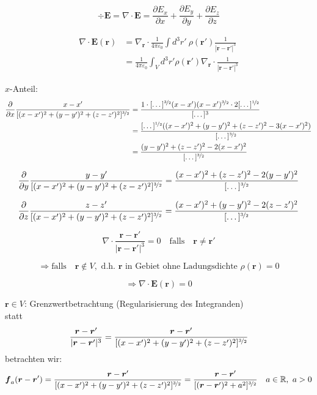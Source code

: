 \documentclass[titlepage,11pt,a4paper,ngerman]{report}
\newcommand{\prt}[2]{\frac{\partial #1}{\partial #2}}
\newcommand{\kq}{\frac{1}{4\pi\epsilon_0}}
\renewcommand{\vec}[1]{\boldsymbol{#1}}
\renewcommand{\epsilon}{\varepsilon}
\begin{document}
$$\div \vec{E} = \nabla \cdot \vec{E} = \prt{E_x}{x} + \prt{E_y}{y} + \prt{E_z}{z}$$

\begin{align*}
\nabla \cdot \vec{E}(\vec{r}) &= \nabla_{\vec{r}} \cdot \kq \int d^3r'\ \rho(\vec{r}') \frac{1}{|\vec{r} - \vec{r}'|^3}\\
&= \kq \int_V d^3 r' \rho (\vec{r}') \nabla_{\vec{r}} \cdot \frac{1}{|\vec{r} - \vec{r}'|^3}
\end{align*}

$x$-Anteil:
\begin{align*}
\frac{\partial}{\partial x}\frac{x-x'}{[(x-x')^2 + (y-y')^2 + (z-z')^2]^{\nicefrac{3}{2}}} &= \frac{1 \cdot [\dots]^{\nicefrac{3}{2}}(x - x')(x - x')^{\nicefrac{3}{2}}\cdot 2[\dots]^{\nicefrac{1}{2}}}{[\dots]^3}\\
&= \frac{[\dots]^{\nicefrac{1}{2}}((x - x')^2 + (y - y')^2 + (z - z')^2 - 3(x - x')^2)}{[\dots]^{\nicefrac{3}{2}}}\\
&= \frac{(y - y')^2 + (z - z')^2 - 2(x - x')^2}{[\dots]^{\nicefrac{3}{2}}}
\end{align*}

$$\frac{\partial}{\partial y} \frac{y-y'}{[(x-x')^2 + (y-y')^2 + (z-z')^2]^{\nicefrac{3}{2}}} = \frac{(x - x')^2 + (z - z')^2 - 2(y - y')^2}{[\dots]^{\nicefrac{3}{2}}}$$ 

$$\frac{\partial}{\partial z} \frac{z-z'}{[(x-x')^2 + (y-y')^2 + (z-z')^2]^{\nicefrac{3}{2}}} = \frac{(x - x')^2 + (y - y')^2 - 2(z - z')^2}{[\dots]^{\nicefrac{3}{2}}}$$ 

$$\nabla \cdot \frac{\vec{r} - \vec{r}'}{|\vec{r} - \vec{r}'|^3} = 0 \quad \textrm{falls} \quad \vec{r} \neq \vec{r}'$$

$$\Rightarrow \textrm{falls} \quad \vec{r} \notin V, \textrm{ d.h. } \vec{r} \textrm{ in Gebiet ohne Ladungsdichte } \rho(\vec{r}) = 0$$

$$\Rightarrow \nabla \cdot \vec{E}(\vec{r}) = 0$$ 








$\vec{r} \in V$: Grenzwertbetrachtung (Regularisierung des Integranden)\\
statt
$$\frac{\vec{r} - \vec{r}'}{|\vec{r} - \vec{r}'|^3} = \frac{\vec{r}-\vec{r}'}{[(x-x')^2 + (y-y')^2 + (z-z')^2]^{\nicefrac{3}{2}}}$$
betrachten wir:
$$\vec{f}_a (\vec{r}-\vec{r}') = \frac{\vec{r}-\vec{r}'}{[(x-x')^2 + (y-y')^2 + (z-z')^2]^{\nicefrac{3}{2}}} = \frac{\vec{r}-\vec{r}'}{[(\vec{r}-\vec{r}')^2 + a^2]^{\nicefrac{3}{2}}} \quad a \in \mathbb R,\ a>0$$
\end{document}
